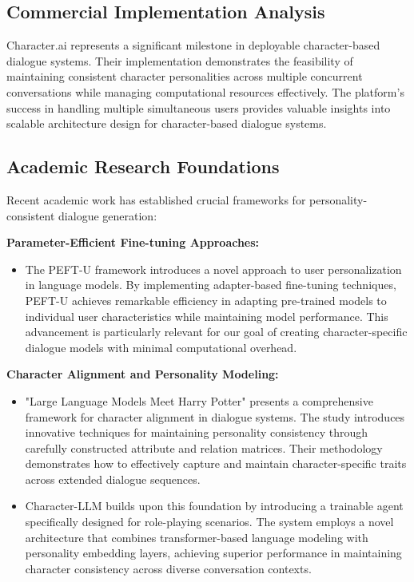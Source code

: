 \documentclass{article}
\begin{document}
\subsection{Commercial Implementation Analysis}
Character.ai represents a significant milestone in deployable character-based dialogue systems. Their implementation demonstrates the feasibility of maintaining consistent character personalities across multiple concurrent conversations while managing computational resources effectively. The platform's success in handling multiple simultaneous users provides valuable insights into scalable architecture design for character-based dialogue systems.

\subsection{Academic Research Foundations}
Recent academic work has established crucial frameworks for personality-consistent dialogue generation:

\textbf{Parameter-Efficient Fine-tuning Approaches:}
\begin{itemize}
\item The PEFT-U framework \cite{clarke2024} introduces a novel approach to user personalization in language models. By implementing adapter-based fine-tuning techniques, PEFT-U achieves remarkable efficiency in adapting pre-trained models to individual user characteristics while maintaining model performance. This advancement is particularly relevant for our goal of creating character-specific dialogue models with minimal computational overhead.
\end{itemize}

\textbf{Character Alignment and Personality Modeling:}
\begin{itemize}
\item "Large Language Models Meet Harry Potter" \cite{chen2023} presents a comprehensive framework for character alignment in dialogue systems. The study introduces innovative techniques for maintaining personality consistency through carefully constructed attribute and relation matrices. Their methodology demonstrates how to effectively capture and maintain character-specific traits across extended dialogue sequences.
\item Character-LLM \cite{shao2023} builds upon this foundation by introducing a trainable agent specifically designed for role-playing scenarios. The system employs a novel architecture that combines transformer-based language modeling with personality embedding layers, achieving superior performance in maintaining character consistency across diverse conversation contexts.
\end{itemize}
\end{document}
